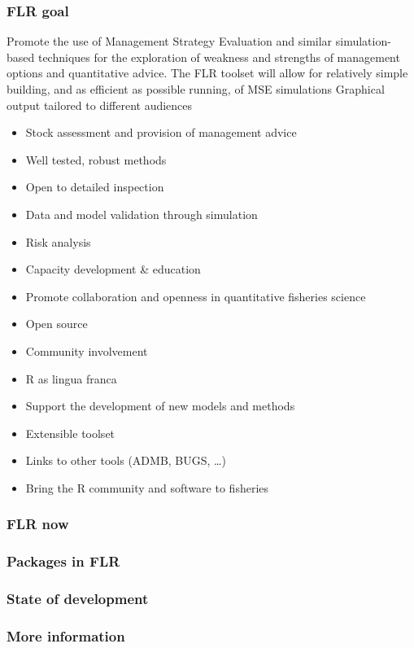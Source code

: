 \begin{frame}\frametitle{FLR goal}

Promote the use of Management Strategy Evaluation and similar
simulation-based techniques for the exploration of weakness and
strengths of management options and quantitative advice. The FLR toolset
will allow for relatively simple building, and as efficient as possible
running, of MSE simulations Graphical output tailored to different
audiences

\begin{itemize}[<+->]
\item
  Stock assessment and provision of management advice
\item
  Well tested, robust methods
\item
  Open to detailed inspection
\item
  Data and model validation through simulation
\item
  Risk analysis
\item
  Capacity development \& education
\item
  Promote collaboration and openness in quantitative fisheries science
\item
  Open source
\item
  Community involvement
\item
  R as lingua franca
\item
  Support the development of new models and methods
\item
  Extensible toolset
\item
  Links to other tools (ADMB, BUGS, \ldots{})
\item
  Bring the R community and software to fisheries
\end{itemize}
\end{frame}

\begin{frame}\frametitle{FLR now}

\end{frame}

\begin{frame}\frametitle{Packages in FLR}

\end{frame}

\begin{frame}\frametitle{State of development}

\end{frame}

\begin{frame}\frametitle{More information}

\end{frame}
